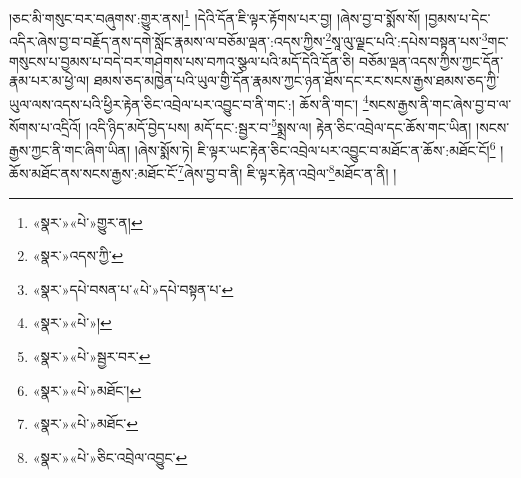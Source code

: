 །ཅང་མི་གསུང་བར་བཞུགས་:གྱུར་ནས།\footnote{«སྣར་»«པེ་»གྱུར་ན།} །དེའི་དོན་ཇི་ལྟར་རྟོགས་པར་བྱ། །ཞེས་བྱ་བ་སྨོས་སོ། །བྱམས་པ་དེང་འདིར་ཞེས་བྱ་བ་བརྗོད་ནས་དགེ་སློང་རྣམས་ལ་བཅོམ་ལྡན་:འདས་ཀྱིས་\footnote{«སྣར་»འདས་ཀྱི་}སཱ་ལུ་ལྗང་པའི་:དཔེས་བསྟན་པས་\footnote{«སྣར་»དཔེ་བསན་པ་«པེ་»དཔེ་བསྟན་པ་}གང་གསུངས་པ་བྱམས་པ་བདེ་བར་གཤེགས་པས་བཀའ་སྩལ་པའི་མདོ་དེའི་དོན་ཅི། བཅོམ་ལྡན་འདས་ཀྱིས་ཀྱང་དོན་རྣམ་པར་མ་ཕྱེ་ལ། ཐམས་ཅད་མཁྱེན་པའི་ཡུལ་གྱི་དོན་རྣམས་ཀྱང་ཉན་ཐོས་དང་རང་སངས་རྒྱས་ཐམས་ཅད་ཀྱི་ཡུལ་ལས་འདས་པའི་ཕྱིར་རྟེན་ཅིང་འབྲེལ་པར་འབྱུང་བ་ནི་གང་:། ཆོས་ནི་གང་། \footnote{«སྣར་»«པེ་»།  }སངས་རྒྱས་ནི་གང་ཞེས་བྱ་བ་ལ་སོགས་པ་འདྲིའོ། །འདི་ཉིད་མདོ་བྱེད་པས། མདོ་དང་:སྦྱར་བ་\footnote{«སྣར་»«པེ་»སྦྱར་བར་}སྨྲས་ལ། རྟེན་ཅིང་འབྲེལ་དང་ཆོས་གང་ཡིན། །སངས་རྒྱས་ཀྱང་ནི་གང་ཞིག་ཡིན། །ཞེས་སྨོས་ཏེ། ཇི་ལྟར་ཡང་རྟེན་ཅིང་འབྲེལ་པར་འབྱུང་བ་མཐོང་ན་ཆོས་:མཐོང་ངོ།\footnote{«སྣར་»«པེ་»མཐོང་།} །ཆོས་མཐོང་ནས་སངས་རྒྱས་:མཐོང་ངོ་\footnote{«སྣར་»«པེ་»མཐོང་}ཞེས་བྱ་བ་ནི། ཇི་ལྟར་རྟེན་འབྲེལ་\footnote{«སྣར་»«པེ་»ཅིང་འབྲེལ་འབྱུང་}མཐོང་ན་ནི། །
